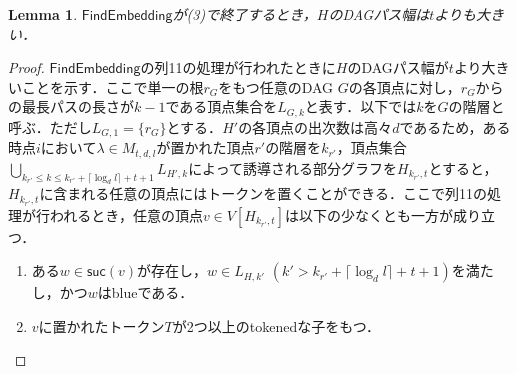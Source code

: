 \documentclass[master]{kuisthesis}		%
\theoremstyle{plain}
\newtheorem{lemma}{Lemma}
\theoremstyle{definition}
\begin{document}
\begin{lemma}\label{lemma_(3)}
    $\mathsf{FindEmbedding}$が(3)で終了するとき，$H$のDAGパス幅は$t$よりも大きい．
\end{lemma}

\begin{proof}
    $\mathsf{FindEmbedding}$の列11の処理が行われたときに$H$のDAGパス幅が$t$より大きいことを示す．ここで単一の根$r_G$をもつ任意のDAG $G$の各頂点に対し，$r_G$からの最長パスの長さが$k-1$である頂点集合を$L_{G, k}$と表す．以下では$k$を$G$の階層と呼ぶ．ただし$L_{G, 1} = \{r_G\}$とする．$H'$の各頂点の出次数は高々$d$であるため，ある時点$i$において$\lambda \in M_{t, d, l}$が置かれた頂点$r'$の階層を$k_{r'}$，頂点集合$\bigcup_{k_{r'} \leq k \leq k_{r'}+ \lceil \log_d l \rceil +t+1} L_{H', k}$によって誘導される部分グラフを$H_{k_{r'}, t}$とすると，$H_{k_{r'}, t}$に含まれる任意の頂点にはトークンを置くことができる．ここで列11の処理が行われるとき，任意の頂点$v \in V[H_{k_{r'}, t}]$は以下の少なくとも一方が成り立つ．

    \begin{enumerate}
        \item ある$w \in \mathsf{suc}(v)$が存在し，$w \in L_{H, k'}$ $(k' > k_{r'}+ \lceil \log_d l \rceil +t+1)$を満たし，かつ$w$はblueである． \label{cond1}
        \item $v$に置かれたトークン$T$が2つ以上のtokenedな子をもつ． \label{cond2}
    \end{enumerate}
    

\end{proof}
\end{document}
